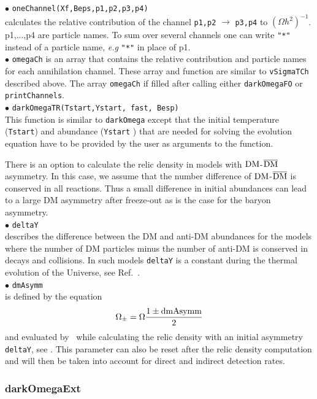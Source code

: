 \documentclass[12pt,a4paper]{article}
\begin{document}
\noindent
$\bullet$ \verb|oneChannel(Xf,Beps,p1,p2,p3,p4)|\\   
calculates the relative   contribution of the  channel \verb|p1,p2| $\to$ \verb|p3,p4|
to $(\Omega h^2)^{-1}$. p1,...,p4 are particle names.  To 
sum over several channels one can write  \verb|"*"| instead 
of  a particle name, {\it e.g} \verb|"*"| in place of p1.\\

\noindent
$\bullet$ \verb|omegaCh| is an array that contains the relative contribution and particle names for each
annihilation channel. These array and function
are similar to {\tt vSigmaTCh} described above. The array {\tt omegaCh} if filled after calling either
{\tt darkOmegaFO} or {\tt printChannels}. \\

\noindent
$\bullet$ \verb|darkOmegaTR(Tstart,Ystart, fast, Besp)|\\
This function is similar to  \verb|darkOmega| except that the  initial  temperature (\verb|Tstart|) and abundance (\verb|Ystart| ) that are needed for solving the  evolution equation have to be provided by   the user as arguments to the function.


There is an option to calculate the relic density in  models with  ${\rm DM}$-$\overline{\rm DM}$ asymmetry.  
In this case, we assume that the  number difference of ${\rm DM}$-$\overline{\rm DM}$ is conserved in all reactions.
Thus a small difference in initial abundances can lead to a  large DM asymmetry after freeze-out as is the case for the  baryon asymmetry.\\

\noindent
$\bullet$ \verb|deltaY|\\
describes the difference between the DM and anti-DM abundances for the
models where the number of DM particles minus the number of anti-DM is conserved in
decays and collisions. In such models \verb|deltaY| is a
constant during the thermal evolution of the Universe,   see Ref.~\cite{Belanger:2013oya}.\\
\noindent
$\bullet$ \verb|dmAsymm|\\
is defined by the equation 
$$ \Omega_{\pm} = \Omega \frac{1 \pm {\rm dmAsymm}}{2}$$
and evaluated  by \micro\ while calculating the relic density  with an
initial asymmetry \verb|deltaY|, see \cite{Belanger:2013oya}. 
This parameter can also be reset  after the relic density 
computation and will then be taken into account for direct and 
indirect detection rates.

\subsubsection{darkOmegaExt} 
\end{document}
